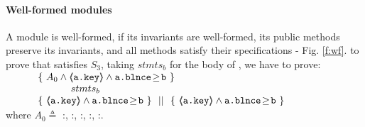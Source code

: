 \paragraph{Well-formed modules} A module is well-formed, if  its invariants are well-formed,    its public methods preserve   its invariants, and  all  methods satisfy their specifications - \cf  Fig.  \ref{f:wf}.
%
%
%
\Eg to prove  that   satisfies {$S_3$}, taking   $stmts_{b}$ %
for the    body of ,  we  have to prove:
\\
$
\begin{array}{ll}
\ \ \ \ \  &   
                     \{ \ {A_0  \wedge  \inside{\prg{a.\password}} \wedge  \prg{a.\balance}\!\geq\!{\prg{b} } } \  \} \\
		& \ \ \ \ \ \ \ \ \ \   stmts_{b} \  \\
		&
                   \{\  {\inside{\prg{a.\password}} \wedge  \prg{a.\balance}\!\geq\!{\prg{b}} }  \ \}\ \  ||\ \  \{\ \inside{\prg{a.\password}}\wedge  \prg{a.\balance}\!\geq\!{\prg{b}}   \ \} 
\end{array}
$
\\
\noindent 
 where $A_0 \triangleq $ %
:, :, :, :,  :.


